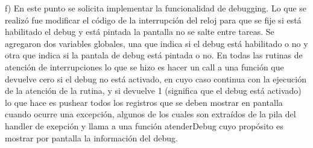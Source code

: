 \documentclass[a4paper]{article}
\begin{document}
f) En este punto se solicita implementar la funcionalidad de debugging. Lo que se realizó fue modificar el código de la interrupción del reloj para que se fije si está habilitado el debug y está pintada la pantalla no se salte entre tareas. Se agregaron dos variables globales, una que indica si el debug está habilitado o no y otra que indica si la pantala de debug está pintada o no. En todas las rutinas de atención de interrupciones lo que se hizo es hacer un call a una función que devuelve cero si el debug no está activado, en cuyo caso continua con la ejecución de la atención de la rutina, y si devuelve 1 (significa que el debug está activado) lo que hace es pushear todos los registros que se deben mostrar en pantalla cuando ocurre una excepción, algunos de los cuales son extraídos de la pila del handler de exepción y llama a una función atenderDebug cuyo propósito es mostrar por pantalla la información del debug.
\end{document}
